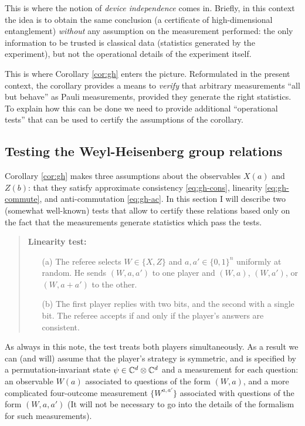 This is where the notion of \emph{device independence} comes in. Briefly, in this context the idea is to obtain the same conclusion (a certificate of high-dimensional entanglement) \emph{without} any assumption on the measurement performed: the only information to be trusted is classical data (statistics generated by the experiment), but not the operational details of the experiment itself. 

This is where Corollary \ref{cor:gh} enters the picture. Reformulated in the present context, the corollary provides a means to \emph{verify} that arbitrary measurements ``all but behave'' as Pauli measurements, provided they generate the right statistics. To explain how this can be done we need to provide additional ``operational tests'' that can be used to certify  the assumptions of the corollary. 


\subsection{Testing the Weyl-Heisenberg group relations}
\label{subsection-testing-weyl-heisenberg-group-relations}

Corollary \ref{cor:gh} makes three assumptions about the observables $X(a)$ and $Z(b)$: that they satisfy approximate consistency \eqref{eq:gh-cons}, linearity \eqref{eq:gh-commute}, and anti-commutation \eqref{eq:gh-ac}. In this section I will describe two (somewhat well-known)  tests that allow to certify these relations based only on the fact that the measurements generate statistics which pass the tests. 

\begin{quote}
\textbf{Linearity test:}
\begin{itemize}
\item[(a)] The referee selects $W\in\{X,Z\}$ and $a,a'\in\{0,1\}^n$ uniformly at random. He sends $(W,a,a')$ to one player and $(W,a)$, $(W,a')$, or $(W,a+a')$ to the other. 
\item[(b)] The first player replies with two bits, and the second with a single bit. The referee accepts if and only if the player's answers are consistent. 
\end{itemize}
\end{quote}

As always in this note, the test treats both players simultaneously. As a result we can (and will) assume that the player's strategy is symmetric, and is specified by a permutation-invariant state $\psi\in \mathbb{C}^d \otimes \mathbb{C}^d$ and a measurement for each question: an observable $W(a)$ associated to questions of the form $(W,a)$, and a more complicated four-outcome measurement $\{W^{a,a'}\}$ associated with questions of the form $(W,a,a')$ (It will not be necessary to go into the details of the formalism for such measurements). 


